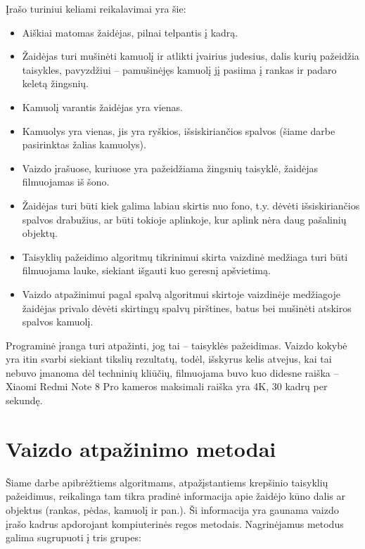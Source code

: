 \documentclass{VUMIFPSbakalaurinis}
\begin{document}
Įrašo turiniui keliami reikalavimai yra šie:

\begin{itemize}
	\item Aiškiai matomas žaidėjas, pilnai telpantis į kadrą. 
	\item Žaidėjas turi mušinėti kamuolį ir atlikti įvairius judesius, dalis kurių pažeidžia taisykles, pavyzdžiui – pamušinėjęs kamuolį jį pasiima į rankas ir padaro keletą žingsnių. 
	\item Kamuolį varantis žaidėjas yra vienas. 
	\item Kamuolys yra vienas, jis yra ryškios, išsiskiriančios spalvos (šiame darbe pasirinktas žalias kamuolys). 
	\item Vaizdo įrašuose, kuriuose yra pažeidžiama žingsnių taisyklė, žaidėjas filmuojamas iš šono. 
	\item Žaidėjas turi būti kiek galima labiau skirtis nuo fono, t.y. dėvėti išsiskiriančios spalvos drabužius, ar būti tokioje aplinkoje, kur aplink nėra daug pašalinių objektų. 
	\item Taisyklių pažeidimo algoritmų tikrinimui skirta vaizdinė medžiaga turi būti filmuojama lauke, siekiant išgauti kuo geresnį apšvietimą. 
	\item Vaizdo atpažinimui pagal spalvą algoritmui skirtoje vaizdinėje medžiagoje žaidėjas privalo dėvėti skirtingų spalvų pirštines, batus bei mušinėti atskiros spalvos kamuolį. 
\end{itemize}

Programinė įranga turi atpažinti, jog tai – taisyklės pažeidimas. Vaizdo kokybė yra itin svarbi siekiant tikslių rezultatų, todėl, išskyrus kelis atvejus, kai tai nebuvo įmanoma dėl techninių kliūčių, filmuojama buvo kuo didesne raiška – Xiaomi Redmi Note 8 Pro kameros maksimali raiška yra 4K, 30 kadrų per sekundę. 

\section{Vaizdo atpažinimo metodai}

Šiame darbe apibrėžtiems algoritmams, atpažįstantiems krepšinio taisyklių pažeidimus, reikalinga tam tikra pradinė informacija apie žaidėjo kūno dalis ar objektus (rankas, pėdas, kamuolį ir pan.). Ši informacija yra gaunama vaizdo įrašo kadrus apdorojant kompiuterinės regos metodais. 
Nagrinėjamus metodus galima sugrupuoti į tris grupes: 
\end{document}
